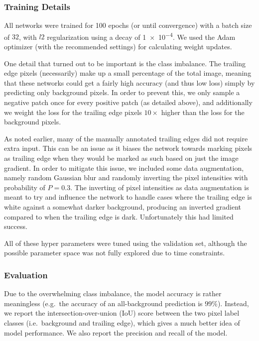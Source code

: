 
\subsubsection{Training Details}

All networks were trained for 100 epochs (or until convergence) with a batch size of $32$, with $l2$ regularization using a decay of \num{1e-4}.
We used the Adam optimizer \cite{kingma2014adam} (with the recommended settings) for calculating weight updates.

One detail that turned out to be important is the class imbalance.
The trailing edge pixels (necessarily) make up a small percentage of the total image, meaning that these networks could get a fairly high accuracy (and thus low loss) simply by predicting only background pixels.
In order to prevent this, we only sample a negative patch once for every positive patch (as detailed above), and additionally we weight the loss for the trailing edge pixels $10\times$ higher than the loss for the background pixels.

As noted earlier, many of the manually annotated trailing edges did not require extra input.
This can be an issue as it biases the network towards marking pixels as trailing edge when they would be marked as such based on just the image gradient.
In order to mitigate this issue, we included some data augmentation, namely random Gaussian blur and randomly inverting the pixel intensities with probability of $P=0.3$.
The inverting of pixel intensities as data augmentation is meant to try and influence the network to handle cases where the trailing edge is white against a somewhat darker background, producing an inverted gradient compared to when the trailing edge is dark.
Unfortunately this had limited success.


All of these hyper parameters were tuned using the validation set, although the possible parameter space was not fully explored due to time constraints.

\subsubsection{Evaluation}

Due to the overwhelming class imbalance, the model accuracy is rather meaningless (e.g.\ the accuracy of an all-background prediction is $99\%$).
Instead, we report the intersection-over-union (IoU) score between the two pixel label classes (i.e.\ background and trailing edge), which gives a much better idea of model performance.
We also report the precision and recall of the model.

